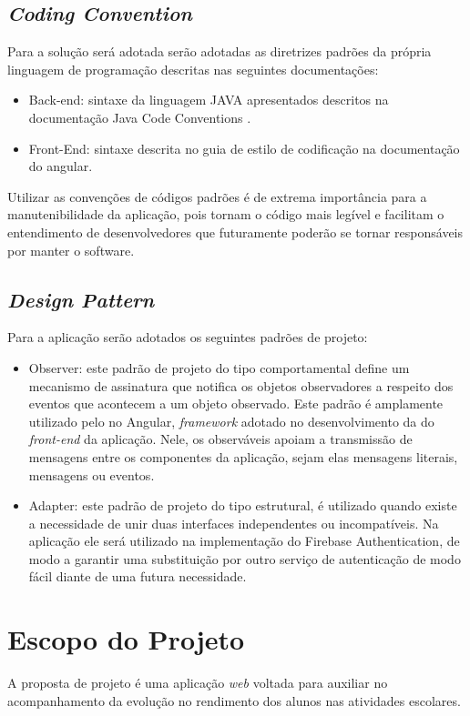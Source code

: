 \documentclass[
    12pt,               %
    openright,          %
    oneside,
    a4paper,            %
    paginasA3,  %
    english,            %
    brazil              %
    ]{ifsp-spo-inf-ctds} %
\begin{document}
\section{\textit{Coding Convention}}
Para a solução será adotada serão adotadas as diretrizes padrões da própria linguagem de programação descritas nas seguintes documentações:

\begin{itemize}
\item Back-end: sintaxe da linguagem JAVA  apresentados descritos na documentação Java Code Conventions \cite{javacodeconvention:1997}.
\item Front-End: sintaxe descrita no guia de estilo de codificação na documentação do angular. \cite{angularstyleguide:2021} 
\end{itemize}


Utilizar as convenções de códigos padrões é de extrema importância para a manutenibilidade da aplicação, pois tornam o código mais legível e facilitam o entendimento de desenvolvedores que futuramente poderão se tornar responsáveis por manter o software.



\section{\textit{Design Pattern}}
Para a aplicação serão adotados os seguintes padrões de projeto:
\begin{itemize}
\item  Observer: este padrão de projeto do tipo comportamental define um mecanismo de assinatura que notifica os objetos observadores a respeito dos eventos que acontecem a um objeto observado. 
Este padrão é amplamente utilizado pelo no Angular, \textit{\gls{framework}} adotado no desenvolvimento da do \textit{\gls{front-end}} da aplicação. Nele, os observáveis apoiam a transmissão de mensagens entre os componentes da aplicação, sejam elas mensagens literais, mensagens ou eventos.
\item Adapter: este padrão de projeto do tipo estrutural, é utilizado quando existe a necessidade de unir duas interfaces independentes ou incompatíveis. Na aplicação ele será utilizado na implementação do Firebase Authentication, de modo a garantir uma substituição por outro serviço de autenticação de modo fácil diante de uma futura necessidade.
\end{itemize}

\chapter{Escopo do Projeto}
A proposta de projeto é uma aplicação \textit{web} voltada para auxiliar no acompanhamento da evolução no rendimento dos alunos nas atividades escolares.
\end{document}

